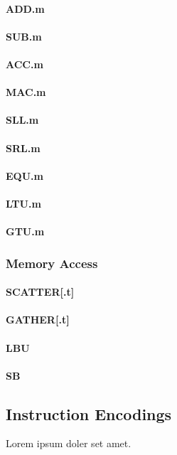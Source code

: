 \paragraph{ADD.m}
\paragraph{SUB.m}
\paragraph{ACC.m}
\paragraph{MAC.m}
\paragraph{SLL.m}
\paragraph{SRL.m}
\paragraph{EQU.m}
\paragraph{LTU.m}
\paragraph{GTU.m}

\subsubsection{Memory Access}
\paragraph{SCATTER[.t]}
\paragraph{GATHER[.t]}
\paragraph{LBU}
\paragraph{SB}


\subsection{Instruction Encodings}

Lorem ipsum doler set amet.


